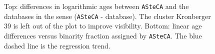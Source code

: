 \documentclass[referee]{aa}
\begin{document}
  \begin{figure}
   \caption{Top: differences in logarithmic ages between \texttt{ASteCA} and
   the databases in the sense (\texttt{ASteCA} - database). The cluster
   Kronberger 39 is left out of the plot to improve visibility.
   Bottom: linear age differences versus binarity fraction assigned by
   \texttt{ASteCA}. The blue dashed line is the regression trend.}
   \label{fig:ages}
  \end{figure}

\end{document}
